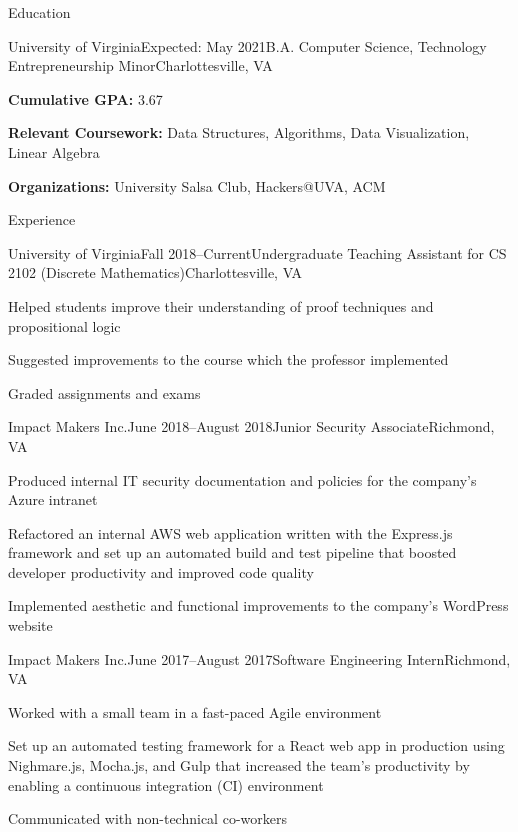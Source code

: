 \documentclass{resume}
\begin{document}
\begin{rSection}{Education}
  \begin{rSubsection}{University of Virginia}{Expected: May 2021}{B.A. Computer Science, Technology Entrepreneurship Minor}{Charlottesville, VA}
  \item \textbf{Cumulative GPA:} 3.67
  \item \textbf{Relevant Coursework:} Data Structures, Algorithms, Data Visualization, Linear Algebra
  \item \textbf{Organizations:} University Salsa Club, Hackers@UVA, ACM
  \end{rSubsection}
\end{rSection}

\begin{rSection}{Experience}

  \begin{rSubsection}{University of Virginia}{Fall 2018--Current}{Undergraduate Teaching Assistant for CS 2102 (Discrete Mathematics)}{Charlottesville, VA}
  \item Helped students improve their understanding of proof techniques and propositional logic
  \item Suggested improvements to the course which the professor implemented
  \item Graded assignments and exams
  \end{rSubsection}

  \begin{rSubsection}{Impact Makers Inc.}{June 2018--August 2018}{Junior Security Associate}{Richmond, VA}
  \item Produced internal IT security documentation and policies for the company's Azure intranet
  \item Refactored an internal AWS web application written with the Express.js framework and set up an automated build and test pipeline that boosted developer productivity and improved code quality
  \item Implemented aesthetic and functional improvements to the company's WordPress website
  \end{rSubsection}

  \begin{rSubsection}{Impact Makers Inc.}{June 2017--August 2017}{Software Engineering Intern}{Richmond, VA}
  \item Worked with a small team in a fast-paced Agile environment
  \item Set up an automated testing framework for a React web app in production using Nighmare.js, Mocha.js, and Gulp that increased the team's productivity by enabling a continuous integration (CI) environment
  \item Communicated with non-technical co-workers
  \end{rSubsection}

\end{rSection}
\end{document}
